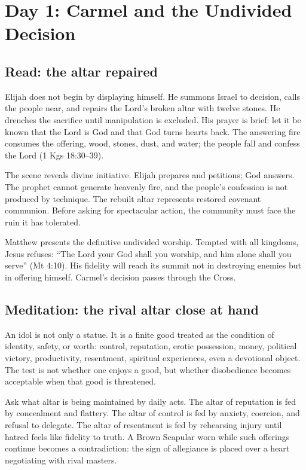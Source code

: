\section{Day 1: Carmel and the Undivided Decision}


\subsection{Read: the altar repaired}

Elijah does not begin by displaying himself. He summons Israel to decision, calls the people near, and repairs the Lord's broken altar with twelve stones. He drenches the sacrifice until manipulation is excluded. His prayer is brief: let it be known that the Lord is God and that God turns hearts back. The answering fire consumes the offering, wood, stones, dust, and water; the people fall and confess the Lord (1 Kgs 18:30--39).

The scene reveals divine initiative. Elijah prepares and petitions; God answers. The prophet cannot generate heavenly fire, and the people's confession is not produced by technique. The rebuilt altar represents restored covenant communion. Before asking for spectacular action, the community must face the ruin it has tolerated.

Matthew presents the definitive undivided worship. Tempted with all kingdoms, Jesus refuses: ``The Lord your God shall you worship, and him alone shall you serve'' (Mt 4:10). His fidelity will reach its summit not in destroying enemies but in offering himself. Carmel's decision passes through the Cross.

\subsection{Meditation: the rival altar close at hand}

An idol is not only a statue. It is a finite good treated as the condition of identity, safety, or worth: control, reputation, erotic possession, money, political victory, productivity, resentment, spiritual experiences, even a devotional object. The test is not whether one enjoys a good, but whether disobedience becomes acceptable when that good is threatened.

Ask what altar is being maintained by daily acts. The altar of reputation is fed by concealment and flattery. The altar of control is fed by anxiety, coercion, and refusal to delegate. The altar of resentment is fed by rehearsing injury until hatred feels like fidelity to truth. A Brown Scapular worn while such offerings continue becomes a contradiction: the sign of allegiance is placed over a heart negotiating with rival masters.

